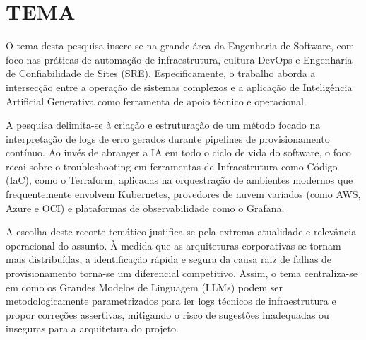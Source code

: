 \section{TEMA}

O tema desta pesquisa insere-se na grande área da Engenharia de Software, com foco nas práticas de automação de infraestrutura, cultura DevOps e Engenharia de Confiabilidade de Sites (SRE). Especificamente, o trabalho aborda a intersecção entre a operação de sistemas complexos e a aplicação de Inteligência Artificial Generativa como ferramenta de apoio técnico e operacional.

A pesquisa delimita-se à criação e estruturação de um método focado na interpretação de logs de erro gerados durante pipelines de provisionamento contínuo. Ao invés de abranger a IA em todo o ciclo de vida do software, o foco recai sobre o troubleshooting em ferramentas de Infraestrutura como Código (IaC), como o Terraform, aplicadas na orquestração de ambientes modernos que frequentemente envolvem Kubernetes, provedores de nuvem variados (como AWS, Azure e OCI) e plataformas de observabilidade como o Grafana.

A escolha deste recorte temático justifica-se pela extrema atualidade e relevância operacional do assunto. À medida que as arquiteturas corporativas se tornam mais distribuídas, a identificação rápida e segura da causa raiz de falhas de provisionamento torna-se um diferencial competitivo. Assim, o tema centraliza-se em como os Grandes Modelos de Linguagem (LLMs) podem ser metodologicamente parametrizados para ler logs técnicos de infraestrutura e propor correções assertivas, mitigando o risco de sugestões inadequadas ou inseguras para a arquitetura do projeto.

